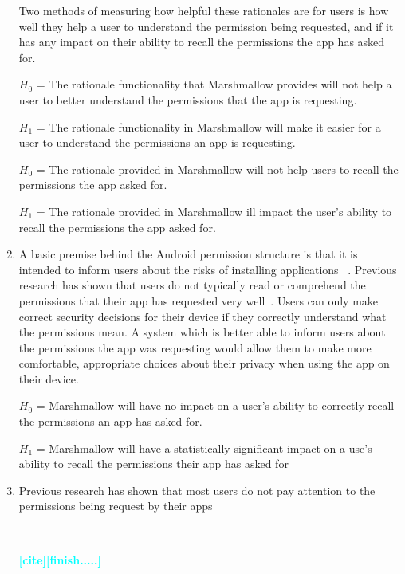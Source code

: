 \documentclass{sig-alternate-05-2015}
\newcommand{\todo}[1]{\textcolor{cyan}{\textbf{[#1]}}}
\begin{document}
\begin{enumerate}
Two methods of measuring how helpful these rationales are for users is how well they help a user to understand the permission being requested, and if it has any impact on their ability to recall the permissions the app has asked for. %

$H_0$ = The rationale functionality that Marshmallow provides will not help a user to better understand the permissions that the app is requesting.

$H_1$ = The rationale functionality in Marshmallow will make it easier for a user to understand the permissions an app is requesting.


$H_0$ = The rationale provided in Marshmallow will not help users to recall the permissions the app asked for.

$H_1$ = The rationale provided in Marshmallow ill impact the user's ability to recall the permissions the app asked for.




\item A basic premise behind the Android permission structure is that it is intended to inform users about the risks of installing applications ~\cite{android_security_overview_URL}. Previous research has shown that users do not typically read or comprehend the permissions that their app has requested very well~\cite{Felt:2012:APU:2335356.2335360, Kelley:2012:CPI:2426020.2426027}. Users can only make correct security decisions for their device if they correctly understand what the permissions mean. A system which is better able to inform users about the permissions the app was requesting would allow them to make more comfortable, appropriate choices about their privacy when using the app on their device. %

$H_0$ = Marshmallow will have no impact on a user's ability to correctly recall the permissions an app has asked for.

$H_1$ = Marshmallow will have a statistically significant impact on a use's ability to recall the permissions their app has asked for


\item Previous research has shown that most users do not pay attention to the permissions being request by their apps


~\cite{Felt:2012:APU:2335356.2335360}

\todo{cite}\todo{finish.....} %






\end{enumerate}
\end{document}
